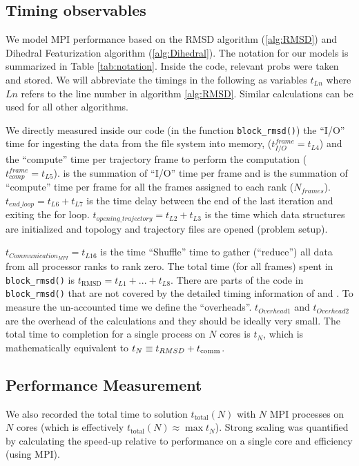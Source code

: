 \label{methods}

\subsection{Timing observables}
We model MPI performance based on the RMSD algorithm (\ref{alg:RMSD}) and Dihedral Featurization algorithm (\ref{alg:Dihedral}). 
The notation for our models is summarized in Table \ref{tab:notation}.
Inside the code, relevant probs were taken and stored. 
We will abbreviate the timings in the following as variables $t_{Ln}$ where $Ln$ refers to the line number in algorithm \ref{alg:RMSD}.
Similar calculations can be used for all other algorithms.

We directly measured inside our code (in the function \texttt{block\_rmsd()}) the ``I/O'' time for
ingesting the data from the file system into memory, ($t_{I/O}^{frame} = t_{L4}$) and the ``compute'' time per
trajectory frame to perform the computation ($t_{comp}^{frame} = t_{L5}$). 
 \tIO is the summation of ``I/O'' time per frame and \tcomp is the summation of ``compute'' time per frame for all the frames assigned to each rank ($N_{frames}$). 
$t_{end\_loop} = t_{L6}+t_{L7}$ is the time delay between the end of the last iteration and exiting the for loop.
$t_{opening\_trajectory} = t_{L2}+t_{L3}$ is the time which data structures are initialized and topology and trajectory files are opened (problem setup).

$t_{Communication_{MPI}} = t_{L16}$ is the time ``Shuffle'' time to gather (``reduce'') all data from all processor ranks to rank zero.
The total time (for all frames) spent in \texttt{block\_rmsd()} is $t_{\text{RMSD}} = t_{L1} + ...+ t_{L8}$. 
There are parts of the code in \texttt{block\_rmsd()} that are not covered by the detailed timing information of \tcomp and \tIO. 
To measure the un-accounted time we define the ``overheads''.
$t_{Overhead1}$ and $t_{Overhead2}$ are the overhead of the calculations and they should be ideally very small.  
The total time to completion for a single process on $N$ cores is $t_{N}$, which is mathematically equivalent to
$t_{N} \equiv t_{RMSD} + t_{\text{comm}}$.

\subsection{Performance Measurement}
We also recorded the total time to solution $t_{\text{total}}(N)$ with $N$ MPI processes on $N$ cores (which is effectively
$t_{\text{total}}(N) \approx \max t_{N}$). 
Strong scaling was quantified by calculating the speed-up relative to performance on a single core and efficiency (using MPI).

